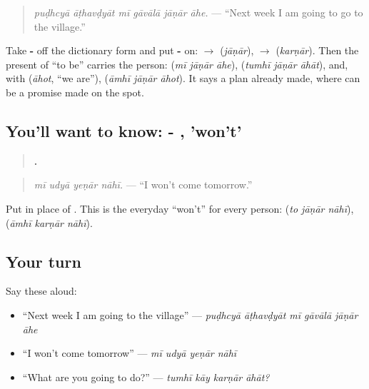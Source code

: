 \begin{quote}
\emph{puḍhcyā āṭhavḍyāt mī gāvālā jāṇār āhe.} — \textquotedblleft{}Next week I am going to go to the village.\textquotedblright{}
\end{quote}

Take \textbf{-} off the dictionary form and put \textbf{-} on: \textbf{} $\to$ \textbf{} (\emph{jāṇār}), \textbf{} $\to$ \textbf{} (\emph{karṇār}). Then the present of \textquotedblleft{}to be\textquotedblright{} carries the person: \textbf{  } (\emph{mī jāṇār āhe}), \textbf{  } (\emph{tumhī jāṇār āhāt}), and, with \textbf{} (\emph{āhot}, \textquotedblleft{}we are\textquotedblright{}), \textbf{  } (\emph{āmhī jāṇār āhot}). It says a plan already made, where \textbf{} can be a promise made on the spot.

\subsection*{You'll want to know: - , 'won't'}
\begin{quote}
\textbf{   .}
\end{quote}

\begin{quote}
\emph{mī udyā yeṇār nāhī.} — \textquotedblleft{}I won't come tomorrow.\textquotedblright{}
\end{quote}

Put \textbf{} in place of \textbf{}. This is the everyday \textquotedblleft{}won't\textquotedblright{} for every person: \textbf{  } (\emph{to jāṇār nāhī}), \textbf{  } (\emph{āmhī karṇār nāhī}).

\subsection*{Your turn}
Say these aloud:

\begin{itemize}
\raggedright
  \item \textquotedblleft{}Next week I am going to the village\textquotedblright{} — \emph{puḍhcyā āṭhavḍyāt mī gāvālā jāṇār āhe}
  \item \textquotedblleft{}I won't come tomorrow\textquotedblright{} — \emph{mī udyā yeṇār nāhī}
  \item \textquotedblleft{}What are you going to do?\textquotedblright{} — \emph{tumhī kāy karṇār āhāt?}
\end{itemize}

